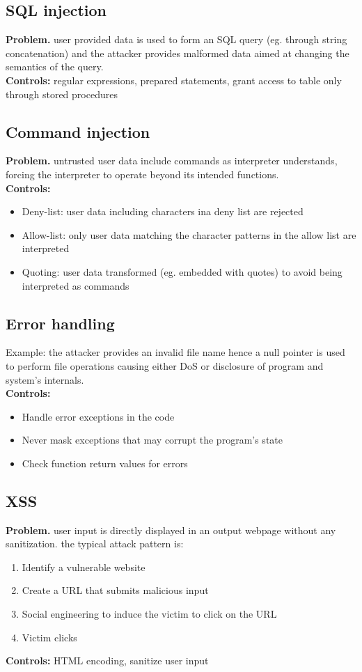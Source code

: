 \documentclass[10pt,a4paper]{article}
\begin{document}
\subsection{SQL injection}
\textbf{Problem.} user provided data is used to form an SQL query (eg. through string concatenation) and the attacker provides malformed data aimed at changing the semantics of the query.\\
\textbf{Controls:} regular expressions, prepared statements, grant access to table only through stored procedures
\subsection{Command injection}
\textbf{Problem.} untrusted user data include commands as interpreter understands, forcing the interpreter to operate beyond its intended functions.\\
\textbf{Controls:}
\begin{itemize}
\item Deny-list: user data including characters ina deny list are rejected
\item Allow-list: only user data matching the character patterns in the allow list are interpreted
\item Quoting: user data transformed (eg. embedded with quotes) to avoid being interpreted as commands
\end{itemize}
\subsection{Error handling}
Example: the attacker provides an invalid file name hence a null pointer is used to perform file operations causing either DoS or disclosure of program and system's internals.\\
\textbf{Controls:}
\begin{itemize}
\item Handle error exceptions in the code
\item Never mask exceptions that may corrupt the program's state
\item Check function return values for errors
\end{itemize}
\subsection{XSS}
\textbf{Problem.} user input is directly displayed in an output webpage without any sanitization. the typical attack pattern is:
\begin{enumerate}
\item Identify a vulnerable website
\item Create a URL that submits malicious input
\item Social engineering to induce the victim to click on the URL
\item Victim clicks
\end{enumerate}
\textbf{Controls:} HTML encoding, sanitize user input
\end{document}

